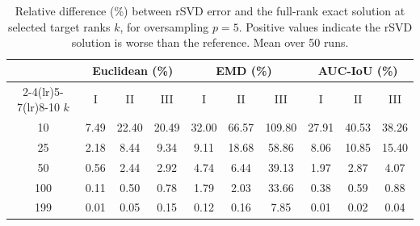 \begin{table}[ht]
\centering
\begin{tabular}{c ccc ccc ccc}
  \toprule
      & \multicolumn{3}{c}{Euclidean (\%)}
      & \multicolumn{3}{c}{EMD (\%)}
      & \multicolumn{3}{c}{AUC-IoU (\%)} \\
  \cmidrule(lr){2-4}\cmidrule(lr){5-7}\cmidrule(lr){8-10}
  $k$ & I & II & III & I & II & III & I & II & III \\
  \midrule
  10  & 7.49 & 22.40 & 20.49 & 32.00 & 66.57 & 109.80 & 27.91 & 40.53 & 38.26 \\
  25  & 2.18 & 8.44 & 9.34 & 9.11 & 18.68 & 58.86 & 8.06 & 10.85 & 15.40 \\
  50  & 0.56 & 2.44 & 2.92 & 4.74 & 6.44 & 39.13 & 1.97 & 2.87 & 4.07 \\
  100 & 0.11 & 0.50 & 0.78 & 1.79 & 2.03 & 33.66 & 0.38 & 0.59 & 0.88 \\
  199 & 0.01 & 0.05 & 0.15 & 0.12 & 0.16 & 7.85 & 0.01 & 0.02 & 0.04 \\
  \bottomrule
\end{tabular}

\caption{Relative difference (\%) between rSVD error and the full-rank exact solution at selected target ranks $k$, for oversampling $p=5$. Positive values indicate the rSVD solution is worse than the reference. Mean over 50 runs.}
\label{tab:rsvd-over-k}
\end{table}
